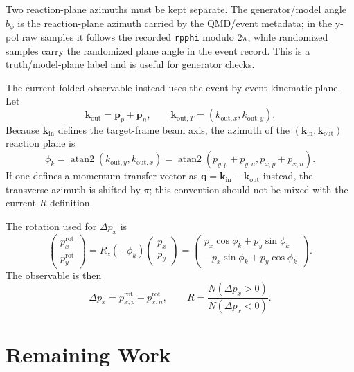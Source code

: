 \documentclass[a4paper,11pt]{article}
\begin{document}
Two reaction-plane azimuths must be kept separate. The generator/model angle $b_\phi$ is the reaction-plane azimuth carried by the QMD/event metadata; in the y-pol raw samples it follows the recorded \texttt{rpphi} modulo $2\pi$, while randomized samples carry the randomized plane angle in the event record. This is a truth/model-plane label and is useful for generator checks.

The current folded observable instead uses the event-by-event kinematic plane. Let
\[
  \mathbf k_{\mathrm{out}}
  =
  \mathbf p_p + \mathbf p_n,
  \qquad
  \mathbf k_{\mathrm{out},T}
  =
  (k_{\mathrm{out},x}, k_{\mathrm{out},y}) .
\]
Because $\mathbf k_{\mathrm{in}}$ defines the target-frame beam axis, the azimuth of the $(\mathbf k_{\mathrm{in}},\mathbf k_{\mathrm{out}})$ reaction plane is
\[
  \phi_k
  =
  \operatorname{atan2}
  \left(k_{\mathrm{out},y}, k_{\mathrm{out},x}\right)
  =
  \operatorname{atan2}
  \left(p_{y,p}+p_{y,n}, p_{x,p}+p_{x,n}\right).
\]
If one defines a momentum-transfer vector as $\mathbf q=\mathbf k_{\mathrm{in}}-\mathbf k_{\mathrm{out}}$ instead, the transverse azimuth is shifted by $\pi$; this convention should not be mixed with the current $R$ definition.

The rotation used for $\Delta p_x$ is
\[
  \begin{pmatrix}
    p_x^{\mathrm{rot}} \\
    p_y^{\mathrm{rot}}
  \end{pmatrix}
  =
  R_z(-\phi_k)
  \begin{pmatrix}
    p_x \\
    p_y
  \end{pmatrix}
  =
  \begin{pmatrix}
    p_x\cos\phi_k + p_y\sin\phi_k \\
    -p_x\sin\phi_k + p_y\cos\phi_k
  \end{pmatrix}.
\]
The observable is then
\[
  \Delta p_x
  =
  p_{x,p}^{\mathrm{rot}} - p_{x,n}^{\mathrm{rot}},
  \qquad
  R
  =
  \frac{N(\Delta p_x>0)}{N(\Delta p_x<0)} .
\]

\section{Remaining Work}
\end{document}
